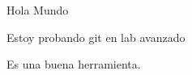 \documentclass{article}
\begin{document}
 
Hola Mundo 

Estoy probando git en lab avanzado 

Es una buena herramienta.
\end{document}
